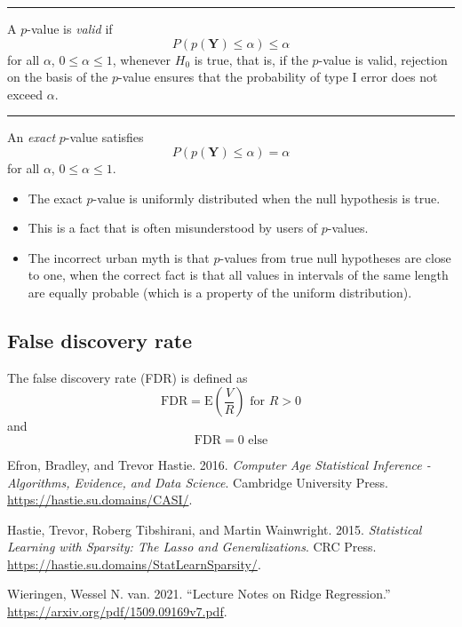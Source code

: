 \documentclass[
  letterpaper,
  DIV=11,
  numbers=noendperiod]{scrartcl}
\providecommand{\tightlist}{%
  \setlength{\itemsep}{0pt}\setlength{\parskip}{0pt}}\usepackage{longtable,booktabs,array}
\newlength{\cslhangindent}
\newlength{\cslentryspacingunit} %
\newenvironment{CSLReferences}[2] %
 {%
  \setlength{\parindent}{0pt}
  \ifodd #1
  \let\oldpar\par
  \def\par{\hangindent=\cslhangindent\oldpar}
  \fi
  \setlength{\parskip}{#2\cslentryspacingunit}
 }%
 {}
\begin{document}
\begin{center}\rule{0.5\linewidth}{0.5pt}\end{center}

A \(p\)-value is \emph{valid} if
\[ P(p(\boldsymbol{Y}) \leq \alpha) \leq \alpha \] for all \(\alpha\),
\(0 \leq \alpha \leq 1\), whenever \(H_0\) is true, that is, if the
\(p\)-value is valid, rejection on the basis of the \(p\)-value ensures
that the probability of type I error does not exceed \(\alpha\).

\begin{center}\rule{0.5\linewidth}{0.5pt}\end{center}

An \emph{exact} \(p\)-value satisfies
\[P(p(\boldsymbol{Y}) \leq \alpha) = \alpha\] for all \(\alpha\),
\(0 \leq \alpha \leq 1\).

\begin{itemize}
\tightlist
\item
  The exact \(p\)-value is uniformly distributed when the null
  hypothesis is true.
\item
  This is a fact that is often misunderstood by users of \(p\)-values.
\item
  The incorrect urban myth is that \(p\)-values from true null
  hypotheses are close to one, when the correct fact is that all values
  in intervals of the same length are equally probable (which is a
  property of the uniform distribution).
\end{itemize}

\hypertarget{false-discovery-rate}{%
\subsection{False discovery rate}\label{false-discovery-rate}}

The false discovery rate (FDR) is defined as
\[ \text{FDR}= \text{E}(\frac{V}{R})  \text{ for }R>0\] and
\[ \text{FDR}= 0 \text{ else} \]

\hypertarget{refs}{}
\begin{CSLReferences}{1}{0}
\leavevmode{}%
Efron, Bradley, and Trevor Hastie. 2016. \emph{Computer Age Statistical
Inference - Algorithms, Evidence, and Data Science}. Cambridge
University Press. \url{https://hastie.su.domains/CASI/}.

\leavevmode{}%
Hastie, Trevor, Roberg Tibshirani, and Martin Wainwright. 2015.
\emph{Statistical Learning with Sparsity: The Lasso and
Generalizations}. CRC Press.
\url{https://hastie.su.domains/StatLearnSparsity/}.

\leavevmode{}%
Wieringen, Wessel N. van. 2021. {``Lecture Notes on Ridge Regression.''}
\url{https://arxiv.org/pdf/1509.09169v7.pdf}.

\end{CSLReferences}
\end{document}
